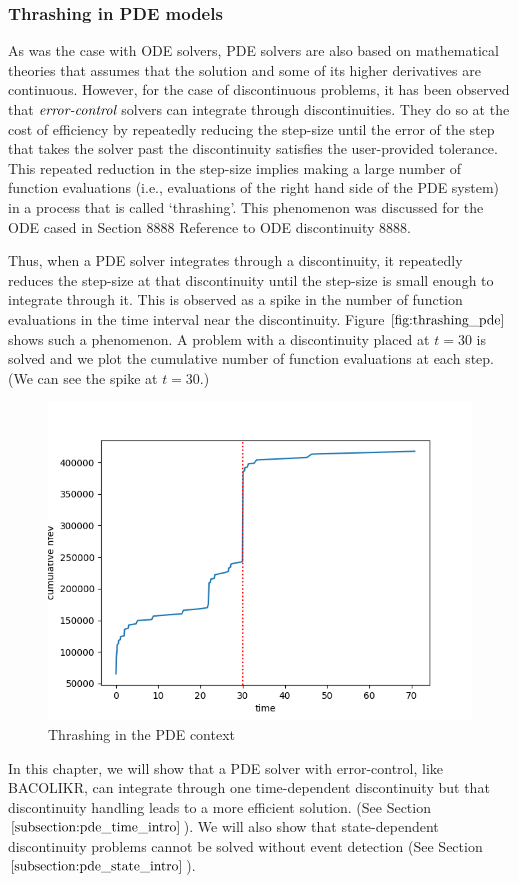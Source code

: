 \documentclass{article}
\begin{document}
\subsubsection{Thrashing in PDE models}
\label{subsection:pde_thrashing}
As was the case with ODE solvers, PDE solvers are also based on mathematical theories that assumes that the solution and some of its higher derivatives are continuous. However, for the case of discontinuous problems, it has been observed that $\emph{error-control}$ solvers can integrate through discontinuities. They do so at the cost of efficiency by repeatedly reducing the step-size until the error of the step that takes the solver past the discontinuity satisfies the user-provided tolerance. This repeated reduction in the step-size implies making a large number of function evaluations (i.e., evaluations of the right hand side of the PDE system) in a process that is called `thrashing'. This phenomenon was discussed for the ODE cased in Section 8888 Reference to ODE discontinuity 8888.

Thus, when a PDE solver integrates through a discontinuity, it repeatedly reduces the step-size at that discontinuity until the step-size is small enough to integrate through it. This is observed as a spike in the number of function evaluations in the time interval near the discontinuity. Figure $\ref{fig:thrashing_pde}$ shows such a phenomenon. A problem with a discontinuity placed at $t=30$ is solved and we plot the cumulative number of function evaluations at each step. (We can see the spike at $t=30$.)
\begin{figure}[H]
\centering
\includegraphics[width=0.7\linewidth]{./figures/pde_thrashing}
\caption{Thrashing in the PDE context}
\label{fig:thrashing_pde}
\end{figure}

In this chapter, we will show that a PDE solver with error-control, like BACOLIKR, can integrate through one time-dependent discontinuity but that discontinuity handling leads to a more efficient solution.
(See Section $\ref{subsection:pde_time_intro}$). We will also show that state-dependent discontinuity problems cannot be solved without event detection (See Section $\ref{subsection:pde_state_intro}$).
\end{document}
